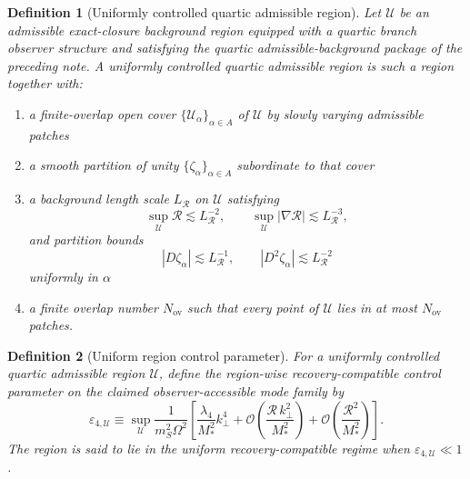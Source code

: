 \documentclass[11pt]{article}
\newtheorem{definition}{Definition}
\begin{document}
\begin{definition}[Uniformly controlled quartic admissible region]
Let \(\mathcal U\) be an admissible exact-closure background region equipped with a quartic branch observer structure and satisfying the quartic admissible-background package of the preceding note. A \emph{uniformly controlled quartic admissible region} is such a region together with:
\begin{enumerate}
    \item a finite-overlap open cover \(\{\mathcal U_\alpha\}_{\alpha\in A}\) of \(\mathcal U\) by slowly varying admissible patches
    \item a smooth partition of unity \(\{\zeta_\alpha\}_{\alpha\in A}\) subordinate to that cover
    \item a background length scale \(L_{\mathcal R}\) on \(\mathcal U\) satisfying
    \begin{equation}
    \sup_{\mathcal U}\mathcal R \lesssim L_{\mathcal R}^{-2},
    \qquad
    \sup_{\mathcal U}|\nabla \mathcal R| \lesssim L_{\mathcal R}^{-3},
    \label{eq:LR}
    \end{equation}
    and partition bounds
    \begin{equation}
    |D\zeta_\alpha|\lesssim L_{\mathcal R}^{-1},
    \qquad
    |D^2\zeta_\alpha|\lesssim L_{\mathcal R}^{-2}
    \label{eq:zetabounds}
    \end{equation}
    uniformly in \(\alpha\)
    \item a finite overlap number \(N_{\mathrm{ov}}\) such that every point of \(\mathcal U\) lies in at most \(N_{\mathrm{ov}}\) patches.
\end{enumerate}
\end{definition}

\begin{definition}[Uniform region control parameter]
For a uniformly controlled quartic admissible region \(\mathcal U\), define the region-wise recovery-compatible control parameter on the claimed observer-accessible mode family by
\begin{equation}
\varepsilon_{4,\mathcal U}
\equiv
\sup_{\mathcal U}
\frac{1}{m_S^2\Omega^2}
\left[
\frac{\lambda_4}{M_*^2}k_\perp^4
+ \mathcal O\!\left(\frac{\mathcal R\,k_\perp^2}{M_*^2}\right)
+ \mathcal O\!\left(\frac{\mathcal R^2}{M_*^2}\right)
\right].
\label{eq:epsU}
\end{equation}
The region is said to lie in the uniform recovery-compatible regime when \(\varepsilon_{4,\mathcal U}\ll 1\).
\end{definition}
\end{document}

